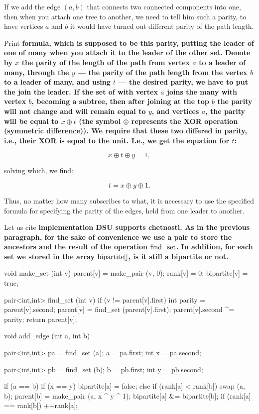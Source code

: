If we add the edge $(a,b)$ that connects two connected components into one, then when you attach one tree to another, we need to tell him such a parity, to have vertices $a$ and $b$ it would have turned out different parity of the path length.

Print \bf{formula}, which is supposed to be this parity, putting the leader of one of many when you attach it to the leader of the other set. Denote by $x$ the parity of the length of the path from vertex $a$ to a leader of many, through the $y$ --- the parity of the path length from the vertex $b$ to a leader of many, and using $t$ --- the desired parity, we have to put the join the leader. If the set of with vertex $a$ joins the many with vertex $b$, becoming a subtree, then after joining at the top $b$ the parity will not change and will remain equal to $y$, and vertices $a$, the parity will be equal to $x \oplus t$ (the symbol $\oplus$ represents the XOR operation (symmetric difference)). We require that these two differed in parity, i.e., their XOR is equal to the unit. I.e., we get the equation for $t$:

$$ x \oplus t \oplus y = 1, $$

solving which, we find:

$$ t = x \oplus y \oplus 1. $$

Thus, no matter how many subscribes to what, it is necessary to use the specified formula for specifying the parity of the edges, held from one leader to another.

Let us cite \bf{implementation} DSU supports chetnosti. As in the previous paragraph, for the sake of convenience we use a pair to store the ancestors and the result of the operation $\rm find\_set$. In addition, for each set we stored in the array ${\rm bipartite}[]$, is it still a bipartite or not.

\code
void make_set (int v) {
parent[v] = make_pair (v, 0);
rank[v] = 0;
bipartite[v] = true;
}

pair<int,int> find_set (int v) {
if (v != parent[v].first) {
int parity = parent[v].second;
parent[v] = find_set (parent[v].first);
parent[v].second ^= parity;
}
return parent[v];
}

void add_edge (int a, int b) {
pair<int,int> pa = find_set (a);
a = pa.first;
int x = pa.second;

pair<int,int> pb = find_set (b);
b = pb.first;
int y = pb.second;

if (a == b) {
if (x == y)
bipartite[a] = false;
}
else {
if (rank[a] < rank[b])
swap (a, b);
parent[b] = make_pair (a, x ^ y ^ 1);
bipartite[a] &= bipartite[b];
if (rank[a] == rank[b])
++rank[a];
}
}

